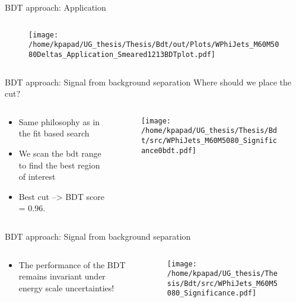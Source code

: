 \documentclass[bigger]{beamer}
\begin{document}
\begin{frame}[label={sec:org2ec8d2c}]{BDT approach: Application}
\begin{columns}
\begin{column}{0.5\columnwidth}
\begin{figure}[h]
\centering
\texttt{[image: /home/kpapad/UG\_thesis/Thesis/Bdt/out/Plots/WPhiJets\_M60M5080Deltas\_Application\_Smeared1213BDTplot.pdf]}
\end{figure}
\end{column}
\end{columns}
\end{frame}

\begin{frame}[label={sec:orgd34a4be}]{BDT approach: Signal from background separation}
\alert{Where should we place the cut?}
\begin{columns}
\begin{column}{0.5\columnwidth}
\begin{itemize}
\item Same philosophy as in the fit based search
\item We scan the bdt range to find the best region of interest
\item Best cut --> BDT score = 0.96.
\end{itemize}
\end{column}
\begin{column}{0.5\columnwidth}
\begin{figure}
\centering
\texttt{[image: /home/kpapad/UG\_thesis/Thesis/Bdt/src/WPhiJets\_M60M5080\_Significance0bdt.pdf]}
\end{figure}
\end{column}
\end{columns}
\end{frame}
\begin{frame}[label={sec:orgaffe3b5}]{BDT approach: Signal from background separation}
\begin{columns}
\begin{column}{0.5\columnwidth}
\begin{itemize}
\item The performance of the BDT remains invariant under energy scale uncertainties!
\end{itemize}
\end{column}
\begin{column}{0.5\columnwidth}
\begin{figure}
\centering
\texttt{[image: /home/kpapad/UG\_thesis/Thesis/Bdt/src/WPhiJets\_M60M5080\_Significance.pdf]}
\end{figure}
\end{column}
\end{columns}
\end{frame}
\end{document}

